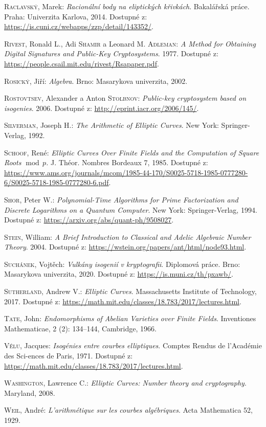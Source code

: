 \documentclass [12pt]{report}
\begin{document}
\begin{thebibliography}{97}
\textsc{Raclavský}, Marek: \textit{Racionální body na eliptických křivkách}. Bakalářská práce. Praha: Univerzita Karlova, 2014. Dostupné z: \url{https://is.cuni.cz/webapps/zzp/detail/143352/}.

\textsc{Rivest}, Ronald L., Adi \textsc{Shamir} a Leonard M. \textsc{Adleman}: \textit{A Method for Obtaining Digital Signatures and Public-Key Cryptosystems}. 1977. Dostupné z: \url{https://people.csail.mit.edu/rivest/Rsapaper.pdf}. 

\textsc{Rosický}, Jiří: \textit{Algebra}. Brno: Masarykova univerzita, 2002.

\textsc{Rostovtsev}, Alexander a Anton \textsc{Stolbnov}:\textit{ Public-key cryptosystem based on isogenies}. 2006. Dostupné z: \url{http://eprint.iacr.org/2006/145/}. 

\textsc{Silverman}, Joseph H.: \textit{The Arithmetic of Elliptic Curves}. New York: Springer-Verlag, 1992. 

\textsc{Schoof}, René: \textit{Elliptic Curves Over Finite Fields and the Computation of Square Roots $\! \operatorname{mod} \, p$.} J. Théor. Nombres Bordeaux 7, 1985. Dostupné z: \url{https://www.ams.org/journals/mcom/1985-44-170/S0025-5718-1985-0777280-6/S0025-5718-1985-0777280-6.pdf}.

\textsc{Shor}, Peter W.: \textit{Polynomial-Time Algorithms for Prime Factorization and Discrete Logarithms on a Quantum Computer}. New York: Springer-Verlag, 1994. Dostupné z: \url{https://arxiv.org/abs/quant-ph/9508027}.

\textsc{Stein}, William: \textit{A Brief Introduction to Classical and Adelic Algebraic Number Theory}. 2004. Dostupné z: \url{https://wstein.org/papers/ant/html/node93.html}.


\textsc{Suchánek}, Vojtěch: \textit{Vulkány isogenií v kryptografii}. Diplomová práce. Brno: Masarykova univerzita, 2020. Dostupné z: \url{https://is.muni.cz/th/pxawb/}.

\textsc{Sutherland}, Andrew V.: \textit{Elliptic Curves}. Massachusetts Institute of Technology, 2017. Dostupné z: \url{https://math.mit.edu/classes/18.783/2017/lectures.html}. 

\textsc{Tate}, John: \textit{Endomorphisms of Abelian Varieties over Finite Fields}. Inventiones Mathematicae, 2 (2): 134–144, Cambridge, 1966.

\textsc{Vélu}, Jacques: \textit{Isogénies entre courbes elliptiques}. Comptes Rendus de l’Académie des Sci-ences de Paris, 1971. Dostupné z: \url{https://math.mit.edu/classes/18.783/2017/lectures.html}. 


\textsc{Washington}, Lawrence C.: \textit{Elliptic Curves: Number theory and cryptography}. Maryland, 2008. 

\textsc{Weil}, André: \textit{L'arithmétique sur les courbes algébriques}.  Acta Mathematica 52, 1929. 


\end{thebibliography}
\end{document}
